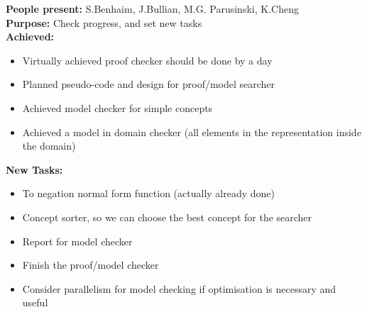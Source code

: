 \documentclass[12pt]{article}
\begin{document}
\textbf{People present:} S.Benhaim, J.Bullian, M.G. Parusinski, K.Cheng \\
\textbf{Purpose:} Check progress, and set new tasks \\
\textbf{Achieved:}
\begin{itemize}
\item Virtually achieved proof checker should be done by a day
\item Planned pseudo-code and design for proof/model searcher
\item Achieved model checker for simple concepts
\item Achieved a model in domain checker (all elements in the representation inside the domain)
\end{itemize}
\textbf{New Tasks:}
\begin{itemize}
\item To negation normal form function (actually already done)
\item Concept sorter, so we can choose the best concept for the searcher
\item Report for model checker
\item Finish the proof/model checker
\item Consider parallelism for model checking if optimisation is necessary and useful
\end{itemize}
\end{document}
